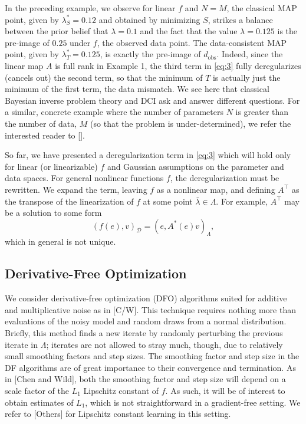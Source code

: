 \documentclass{amsart}
\begin{document}
\vspace{.125cm}

In the preceding example, we observe for linear $f$ and $N=M$, the classical MAP point, given by $\lambda_S^*=0.12$ and obtained by minimizing $S$, strikes a balance between the prior belief that $\lambda=0.1$ and the fact that the value $\lambda=0.125$ is the pre-image of $0.25$ under $f$, the observed data point. The data-consistent MAP point, given by $\lambda_T^*=0.125$, is exactly the pre-image of $d_\text{obs}$. Indeed, since the linear map $A$ is full rank in Example 1, the third term in \eqref{eq:3} fully deregularizes (cancels out) the second term, so that the minimum of $T$ is actually just the minimum of the first term, the data mismatch. We see here that classical Bayesian inverse problem theory and DCI ask and answer different questions. For a similar, concrete example where the number of parameters $N$ is greater than the number of data, $M$ (so that the problem is under-determined), we refer the interested reader to []. 


So far, we have presented a deregularization term in \eqref{eq:3} which will hold only for linear (or linearizable) $f$ and Gaussian assumptions on the parameter and data spaces. For general nonlinear functions $f$, the deregularization must be rewritten. We expand the term, leaving $f$ as a nonlinear map, and defining $A^\top$ as the transpose of the linearization of $f$ at some point $\bar{\lambda}\in \Lambda$. For example, $A^\top$ may be a solution to some form $$(f(e),v)_\mathcal{D}=(e,A^*(e)v)_\Lambda,$$ which in general is not unique. 







\subsection{Derivative-Free Optimization}


We consider derivative-free optimization (DFO) algorithms suited for additive and multiplicative noise as in [C/W]. This technique requires nothing more than evaluations of the noisy model and random draws from a normal distribution. Briefly, this method finds a new iterate by randomly perturbing the previous iterate in $\Lambda$; iterates are not allowed to stray much, though, due to relatively small smoothing factors and step sizes. The smoothing factor and step size in the DF algorithms are of great importance to their convergence and termination. As in [Chen and Wild], both the smoothing factor and step size will depend on a scale factor of the $L_1$ Lipschitz constant of $f$. As such, it will be of interest to obtain estimates of $L_1$, which is not straightforward in a gradient-free setting. We refer to [Others] for Lipschitz constant learning in this setting. 
\end{document}
